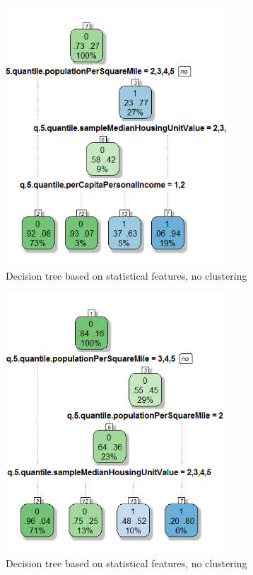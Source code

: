 \documentclass[conference,compsoc]{IEEEtran}
\begin{document}
\begin{figure}[!t]
\centering
\includegraphics[width=3.25in]{decision-tree-02-cluster-1.png}
\caption{Decision tree based on statistical features, no clustering}
\label{decision.tree.02.1}
\end{figure}

\begin{figure}[!t]
\centering
\includegraphics[width=3.25in]{decision-tree-02-cluster-2.png}
\caption{Decision tree based on statistical features, no clustering}
\label{decision.tree.02.2}
\end{figure}
\end{document}
